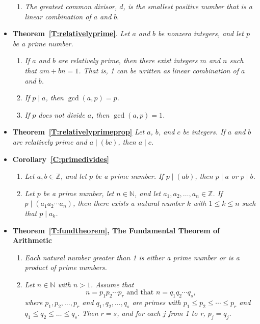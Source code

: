 \begin{itemize}
\begin{enumerate}
\item \emph{The greatest common divisor, $d$, is the smallest positive number that is a linear combination of $a$ and $b$}.
\end{enumerate}



\item \textbf{Theorem~\ref{T:relativelyprime}}.
\emph{Let  $a$  and  $b$  be nonzero integers, and let  $p$  be a  prime number.}

\begin{enumerate}
\item \emph{If  $a$  and  $b$  are relatively prime, then there exist integers  $m$  and  $n$  such that  $am + bn = 1$.  That is,  1  can be written as linear combination of  $a$  and  $b$.}

\item \emph{If  $p \mid a$, then  $\gcd ( {a, p} ) = p$.}

\item \emph{If  $p$  does not divide  $a$, then  $\gcd ( {a, p} ) = 1$.} 
\end{enumerate}

\item \textbf{Theorem~\ref{T:relativelyprimeprop}}
\emph{Let  $a$, $b$, and  $c$ be integers.  If  $a$  and  $b$  are relatively prime  and  
$a \mid ( {bc} )$, then  $a \mid c$.}

\item \textbf{Corollary~\ref{C:primedivides}}
\begin{enumerate}
\item \emph{Let  $a, b \in \mathbb{Z}$, and let  $p$  be a prime number.  If  
$p \mid ( {ab} )$, then  $p \mid a$  or  $p \mid b$.}  

\item \emph{Let  $p$  be a prime number, let  $n \in \mathbb{N}$, and let  
$a_1 ,a_2 , \ldots , a_n  \in \mathbb{Z}$.  If  
$p \mid \left( {a_1 a_2  \cdots a_n } \right)$, then there exists a natural number $k$ 
 with  $1 \leq k \leq n$ such that  $p \mid a_k $.}
\end{enumerate}

\item \textbf{Theorem~\ref{T:fundtheorem}, The Fundamental Theorem of Arithmetic} 
\begin{enumerate}
\item \emph{Each natural number greater than 1 is either a prime number or is a product of prime numbers.}

\item \emph{Let   $n \in \mathbb{N}$ with  $n > 1$.  Assume that
\[
n = p_1 p_2  \cdots p_r \text{  and that  }n = q_1 q_2  \cdots q_s,
\]
where  $p_1 , p_2 ,  \ldots, p_r $ and  $q_1 , q_2 ,  \ldots, q_s $ are primes with  
$p_1  \leq p_2  \leq  \cdots  \leq p_r $ and  
$q_1  \leq q_2  \leq  \dots  \leq q_s $.  Then  $r = s$, and for each  $j$  from  1  to  r,  $p_j  = q_j $.}
\end{enumerate}


\end{itemize}
